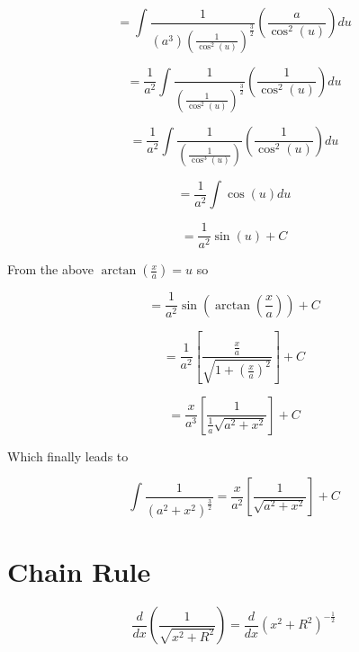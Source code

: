 \documentclass[14pt]{memoir}
\begin{document}
\begin{equation}
=  \int \frac{1}{(a^3)(\frac{1}{\cos^2(u)})^{\frac{3}{2}}} ( \frac{a}{\cos^2{(u)}}) du
\end{equation}

\begin{equation}
=  \frac{1}{a^2} \int \frac{1}{(\frac{1}{\cos^2(u)})^{\frac{3}{2}}} ( \frac{1}{\cos^2{(u)}}) du
\end{equation}

\begin{equation}
=  \frac{1}{a^2} \int \frac{1}{(\frac{1}{\cos^3(u)})} ( \frac{1}{\cos^2{(u)}}) du
\end{equation}

\begin{equation}
=  \frac{1}{a^2} \int \cos{(u)} du
\end{equation}

\begin{equation}
=  \frac{1}{a^2} \sin{(u)} + C
\end{equation}


From the above $\arctan{(\frac{x}{a})} = u$ so

\begin{equation}
=  \frac{1}{a^2} \sin{(\arctan{(\frac{x}{a})})} + C
\end{equation}

\begin{equation}
=  \frac{1}{a^2} [\frac{\frac{x}{a}}{\sqrt{1+(\frac{x}{a})^2}}] + C
\end{equation}

\begin{equation}
=  \frac{x}{a^3} [\frac{1}{\frac{1}{a} \sqrt{a^2+x^2}}] + C
\end{equation}

Which finally leads to

\begin{equation}
\int \frac{1}{(a^2 + x^2)^{\frac{3}{2}}} =  \frac{x}{a^2} [\frac{1}{\sqrt{a^2+x^2}}] + C
\end{equation}





\chapter{Chain Rule}

\begin{equation}
\frac{d}{dx} (\frac{1}{\sqrt{x^2+R^2}}) = \frac{d}{dx} (x^2+R^2)^{-\frac{1}{2}} 
\end{equation}
\end{document}
